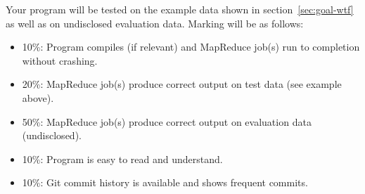 \documentclass[11pt]{article}
\begin{document}
Your program will be tested on the example data shown in
section~\ref{sec:goal-wtf} as well as on undisclosed evaluation
data. Marking will be as follows:
\begin{itemize}
\item 10\%: Program compiles (if relevant) and MapReduce job(s) run to completion without crashing.
\item 20\%: MapReduce job(s) produce correct output on test data (see example above).
\item 50\%: MapReduce job(s) produce correct output on evaluation data (undisclosed).
\item 10\%: Program is easy to read and understand.
\item 10\%: Git commit history is available and shows frequent commits.
\end{itemize}
\end{document}
